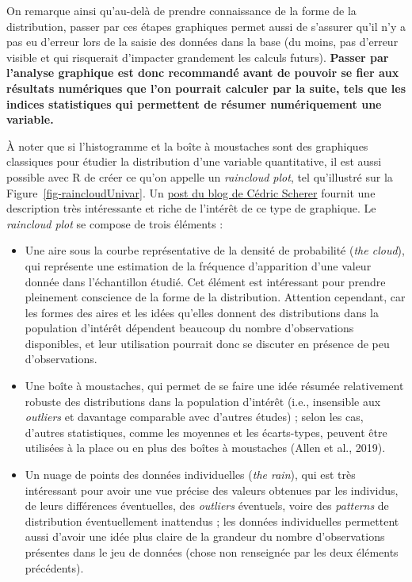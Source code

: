\documentclass[
  letterpaper,
]{book}
\providecommand{\tightlist}{%
  \setlength{\itemsep}{0pt}\setlength{\parskip}{0pt}}\usepackage{longtable,booktabs,array}
\begin{document}
On remarque ainsi qu'au-delà de prendre connaissance de la forme de la
distribution, passer par ces étapes graphiques permet aussi de s'assurer
qu'il n'y a pas eu d'erreur lors de la saisie des données dans la base
(du moins, pas d'erreur visible et qui risquerait d'impacter grandement
les calculs futurs). \textbf{Passer par l'analyse graphique est donc
recommandé avant de pouvoir se fier aux résultats numériques que l'on
pourrait calculer par la suite, tels que les indices statistiques qui
permettent de résumer numériquement une variable.}

À noter que si l'histogramme et la boîte à moustaches sont des
graphiques classiques pour étudier la distribution d'une variable
quantitative, il est aussi possible avec R de créer ce qu'on appelle un
\emph{raincloud plot}, tel qu'illustré sur la
Figure~\ref{fig-raincloudUnivar}. Un
\href{https://www.cedricscherer.com/2021/06/06/visualizing-distributions-with-raincloud-plots-and-how-to-create-them-with-ggplot2/}{post
du blog de Cédric Scherer} fournit une description très intéressante et
riche de l'intérêt de ce type de graphique. Le \emph{raincloud plot} se
compose de trois éléments :

\begin{itemize}
\tightlist
\item
  Une aire sous la courbe représentative de la densité de probabilité
  (\emph{the cloud}), qui représente une estimation de la fréquence
  d'apparition d'une valeur donnée dans l'échantillon étudié. Cet
  élément est intéressant pour prendre pleinement conscience de la forme
  de la distribution. Attention cependant, car les formes des aires et
  les idées qu'elles donnent des distributions dans la population
  d'intérêt dépendent beaucoup du nombre d'observations disponibles, et
  leur utilisation pourrait donc se discuter en présence de peu
  d'observations.
\item
  Une boîte à moustaches, qui permet de se faire une idée résumée
  relativement robuste des distributions dans la population d'intérêt
  (i.e., insensible aux \emph{outliers} et davantage comparable avec
  d'autres études) ; selon les cas, d'autres statistiques, comme les
  moyennes et les écarts-types, peuvent être utilisées à la place ou en
  plus des boîtes à moustaches (Allen et al., 2019).
\item
  Un nuage de points des données individuelles (\emph{the rain}), qui
  est très intéressant pour avoir une vue précise des valeurs obtenues
  par les individus, de leurs différences éventuelles, des
  \emph{outliers} éventuels, voire des \emph{patterns} de distribution
  éventuellement inattendus ; les données individuelles permettent aussi
  d'avoir une idée plus claire de la grandeur du nombre d'observations
  présentes dans le jeu de données (chose non renseignée par les deux
  éléments précédents).
\end{itemize}
\end{document}
